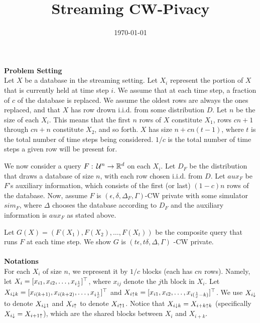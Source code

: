 \documentclass[11pt]{article}
\title{Streaming CW-Pivacy}
\date{\today}
\begin{document}
\maketitle
{\bf Problem Setting} \\
Let $X$ be a database in the streaming setting. Let $X_{i}$ represent the portion of $X$ that is currently held at time step $i$. We assume that at each time step, a fraction of $c$ of the database is replaced. We assume the oldest rows are always the ones replaced, and that $X$ has row drown i.i.d. from some distribution $D$. Let $n$ be the size of each $X_{i}$. This means that the first $n$ rows of $X$ constitute $X_{1}$, rows $cn+1$ through $cn+n$ constitute $X_{2}$, and so forth. $X$ has size $n+cn(t-1)$, where $t$ is the total number of time steps being considered. $1/c$ is the total number of time steps a given row will be present for.

We now consider a query $F: \, {\cal U}^{n} \rightarrow \mathbb{R}^{d}$ on each $X_{i}$. 
Let $D_{F}$ be the distribution that draws a database of size $n$, with each row chosen i.i.d. from $D$. Let $aux_{F}$ be $F$'s auxiliary information, which consists of the first (or last) $(1-c)n$ rows of the database. Now, assume $F$ is $(\epsilon, \delta, \Delta_{F}, \Gamma)$-CW private with some simulator $sim_{F}$, where $\Delta$ chooses the database according to $D_{F}$ and the auxiliary information is $aux_{F}$ as stated above.

Let $G(X) = (F(X_{1}), F(X_{2}) , \dots, F(X_{t}))$ be the composite query that runs $F$ at each time step. We show $G$ is $(t\epsilon, t \delta, \Delta, \Gamma)$ -CW private.
\\
\\
{\bf Notations }\\
For each $X_i$ of size $n$, we represent it by $1/c$ blocks (each has $cn$ rows). Namely, let $X_{i}=[x_{i 1}, x_{i 2} , \dots, x_{i \frac{1}{c}}]^{\top}$, where $x_{ij}$ denote the $j$th block in $X_{i}$. Let $X_{i \downarrow k} = [x_{i (k+1)}, x_{i (k+2)} , \dots, x_{i \frac{1}{c}}]^{\top}$ and $X_{i \uparrow k} = [x_{i 1}, x_{i2} , \dots, x_{i (\frac{1}{c}-k)}]^{\top}$. We use $X_{i \downarrow}$ to denote $X_{i \downarrow 1}$ and $X_{i \uparrow}$ to denote $X_{i \uparrow 1}$. Notice that $X_{i \downarrow k} = X_{i+k \uparrow k}$ (specifically $X_{i \downarrow} = X_{i+1 \uparrow}$), which are the shared blocks between $X_{i}$ and $X_{i+k}$.
\end{document}
